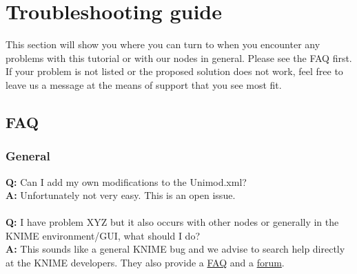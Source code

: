 \section{Troubleshooting guide}
This section will show you where you can turn to when you encounter any problems with this tutorial or with our
nodes in general. Please see the FAQ first. If your problem is not listed or the proposed solution does not work,
feel free to leave us a message at the means of support that you see most fit.

\subsection{FAQ}

\subsubsection{General}
\textbf{Q:} Can I add my own modifications to the Unimod.xml?\\
\textbf{A:} Unfortunately not very easy. This is an open issue.
\\\\
\textbf{Q:} I have problem XYZ but it also occurs with other nodes or generally in the KNIME environment/GUI, what should I do?\\
\textbf{A:} This sounds like a general KNIME bug and we advise to search help directly at the KNIME developers. They also provide a \href{https://tech.knime.org/
faq}{FAQ} and a \href{https://tech.knime.org/forum}{forum}.

